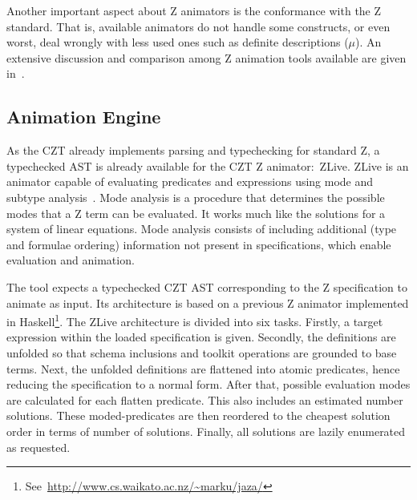 \documentclass{llncs}
\begin{document}
    Another important aspect about Z animators is the conformance with
    the Z standard.  That is, available animators do not handle some
    constructs, or even worst, deal wrongly with less used ones such
    as definite descriptions ($\mu$).  An extensive discussion and
    comparison among Z animation tools available are given
    in~\cite{utting-jaza}.

\subsection{Animation Engine}

    As the CZT already implements parsing and typechecking for
    standard Z, a typechecked AST is already available for the CZT Z
    animator:~ZLive.  ZLive is an animator capable of evaluating
    predicates and expressions using mode and subtype
    analysis~\cite{winikooff98}.  Mode analysis is a procedure that
    determines the possible modes that a Z term can be evaluated. It
    works much like the solutions for a system of linear equations.
    Mode analysis consists of including additional (type and formulae
    ordering) information not present in specifications, which enable
    evaluation and animation.

    The tool expects a typechecked CZT AST corresponding to the Z
    specification to animate as input. Its architecture is based on a
    previous Z animator implemented in
    Haskell\footnote{See~\url{http://www.cs.waikato.ac.nz/~marku/jaza/}}.
    The ZLive architecture is divided into six tasks.  Firstly, a
    target expression within the loaded specification is given.
    Secondly, the definitions are unfolded so that schema inclusions
    and toolkit operations are grounded to base terms. Next, the
    unfolded definitions are flattened into atomic predicates, hence
    reducing the specification to a normal form.  After that, possible
    evaluation modes are calculated for each flatten predicate.  This
    also includes an estimated number solutions.  These
    moded-predicates are then reordered to the cheapest solution order
    in terms of number of solutions. Finally, all solutions are lazily
    enumerated as requested.
\end{document}
